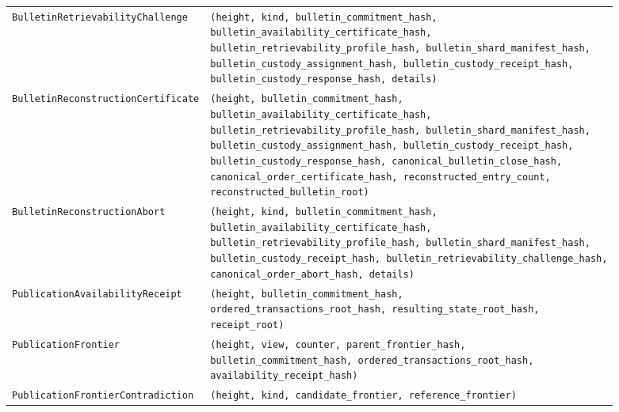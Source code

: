 \documentclass[11pt]{article}
\newcommand{\code}[1]{\texttt{#1}}
\begin{document}
\begin{center}
\begin{tabularx}{\textwidth}{>{\raggedright\arraybackslash}p{} X}
\code{BulletinRetrievabilityChallenge} & \shortstack[l]{\code{(height, kind, bulletin\_commitment\_hash,}\\\code{bulletin\_availability\_certificate\_hash,}\\\code{bulletin\_retrievability\_profile\_hash, bulletin\_shard\_manifest\_hash,}\\\code{bulletin\_custody\_assignment\_hash, bulletin\_custody\_receipt\_hash,}\\\code{bulletin\_custody\_response\_hash, details)}} \\
\code{BulletinReconstructionCertificate} & \shortstack[l]{\code{(height, bulletin\_commitment\_hash,}\\\code{bulletin\_availability\_certificate\_hash,}\\\code{bulletin\_retrievability\_profile\_hash, bulletin\_shard\_manifest\_hash,}\\\code{bulletin\_custody\_assignment\_hash, bulletin\_custody\_receipt\_hash,}\\\code{bulletin\_custody\_response\_hash, canonical\_bulletin\_close\_hash,}\\\code{canonical\_order\_certificate\_hash, reconstructed\_entry\_count,}\\\code{reconstructed\_bulletin\_root)}} \\
\code{BulletinReconstructionAbort} & \shortstack[l]{\code{(height, kind, bulletin\_commitment\_hash,}\\\code{bulletin\_availability\_certificate\_hash,}\\\code{bulletin\_retrievability\_profile\_hash, bulletin\_shard\_manifest\_hash,}\\\code{bulletin\_custody\_receipt\_hash, bulletin\_retrievability\_challenge\_hash,}\\\code{canonical\_order\_abort\_hash, details)}} \\
\code{PublicationAvailabilityReceipt} & \shortstack[l]{\code{(height, bulletin\_commitment\_hash,}\\\code{ordered\_transactions\_root\_hash, resulting\_state\_root\_hash,}\\\code{receipt\_root)}} \\
\code{PublicationFrontier} & \shortstack[l]{\code{(height, view, counter, parent\_frontier\_hash,}\\\code{bulletin\_commitment\_hash, ordered\_transactions\_root\_hash,}\\\code{availability\_receipt\_hash)}} \\
\code{PublicationFrontierContradiction} & \code{(height, kind, candidate\_frontier, reference\_frontier)} \\

\end{tabularx}
\end{center}
\end{document}
